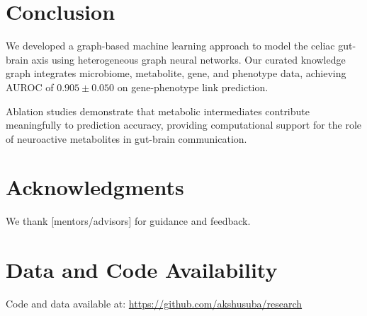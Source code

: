 \documentclass[12pt]{article}
\begin{document}
\section{Conclusion}

We developed a graph-based machine learning approach to model the celiac gut-brain axis using heterogeneous graph neural networks. Our curated knowledge graph integrates microbiome, metabolite, gene, and phenotype data, achieving AUROC of $0.905 \pm 0.050$ on gene-phenotype link prediction.

Ablation studies demonstrate that metabolic intermediates contribute meaningfully to prediction accuracy, providing computational support for the role of neuroactive metabolites in gut-brain communication.

\section*{Acknowledgments}
We thank [mentors/advisors] for guidance and feedback.

\section*{Data and Code Availability}
Code and data available at: \url{https://github.com/akshusuba/research}


\end{document}
